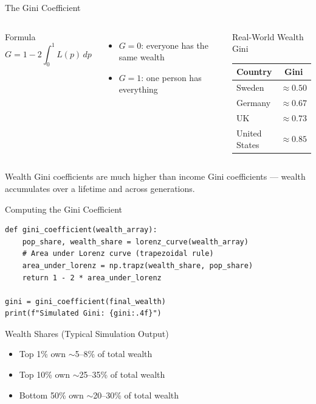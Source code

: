 \documentclass[aspectratio=169, 10pt]{beamer}
\begin{document}
\begin{frame}{The Gini Coefficient}
\begin{columns}[T]
\begin{block}{Formula}
\[
  G = 1 - 2 \int_0^1 L(p)\,dp
\]
\end{block}
\vspace{0.3em}
\begin{itemize}
  \item $G = 0$: everyone has the same wealth
  \item $G = 1$: one person has everything
\end{itemize}
\begin{block}{Real-World Wealth Gini}
\begin{center}
\begin{tabular}{lc}
\toprule
Country & Gini \\
\midrule
Sweden       & $\approx 0.50$ \\
Germany      & $\approx 0.67$ \\
UK           & $\approx 0.73$ \\
United States & $\approx 0.85$ \\
\bottomrule
\end{tabular}
\end{center}
\end{block}
\end{columns}
\vspace{0.5em}
Wealth Gini coefficients are much higher than income Gini coefficients ---
wealth accumulates over a lifetime and across generations.
\end{frame}

\begin{frame}[fragile]{Computing the Gini Coefficient}
\begin{lstlisting}
def gini_coefficient(wealth_array):
    pop_share, wealth_share = lorenz_curve(wealth_array)
    # Area under Lorenz curve (trapezoidal rule)
    area_under_lorenz = np.trapz(wealth_share, pop_share)
    return 1 - 2 * area_under_lorenz

gini = gini_coefficient(final_wealth)
print(f"Simulated Gini: {gini:.4f}")
\end{lstlisting}
\vspace{0.5em}
\begin{block}{Wealth Shares (Typical Simulation Output)}
\begin{itemize}
  \item Top 1\% own $\sim$5--8\% of total wealth
  \item Top 10\% own $\sim$25--35\% of total wealth
  \item Bottom 50\% own $\sim$20--30\% of total wealth
\end{itemize}
\end{block}
\end{frame}
\end{document}
